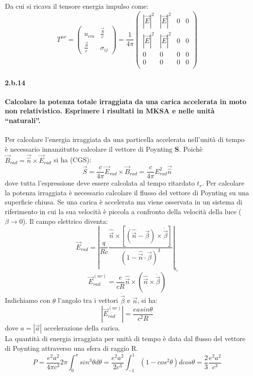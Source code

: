 \documentclass[twoside]{article}
\begin{document}
Da cui si ricava il tensore energia impulso come:
\begin{equation}
    T^{\mu\nu}=\begin{pmatrix} u_{em} & \frac{\vec{S}}{c}\\\frac{\vec{S}}{c}& \sigma_{ij}\end{pmatrix}=\frac{1}{4\pi}\begin{pmatrix} |\vec{E}|^2 & |\vec{E}|^2 & 0 & 0 \\
    |\vec{E}|^2 & |\vec{E}|^2 & 0 & 0 \\ 0&0&0&0\\0&0&0&0\\
    \end{pmatrix}
\end{equation}

\paragraph{2.b.14}\textbf{Calcolare la potenza totale irraggiata da una carica accelerata in moto non relativistico. Esprimere i risultati in MKSA e nelle unità “naturali”.}\\ \\
Per calcolare l'energia irraggiata da una particella accelerata nell'unità di tempo è necessario innanzitutto calcolare il vettore di Poynting \textbf{S}. Poichè $\vec{B}_{rad}=\vec{\hat{n}} \times \vec{E}_{rad}$ si ha (CGS):
\[
\vec{S}=\frac{c}{4 \pi}\vec{E}_{rad}\times \vec{B}_{rad} = \frac{c}{4 \pi} E^2_{rad}\vec{\hat{n}}
\]
dove tutta l'espressione deve essere calcolata al tempo ritardato $t_r$. Per calcolare la potenza irraggiata è necessario calcolare il flusso del vettore di Poynting su una superficie chiusa.  Se una carica è accelerata ma viene osservata in un sistema di riferimento in cui la sua velocità è piccola a confronto della velocità della
luce ($\beta \rightarrow 0$). Il campo elettrico diventa:
\[
\vec{E}_{rad}=\left| \frac{q}{R c}\frac{\hat{\vec{n}}\times[(\hat{\vec{n}}-\vec{\beta})\times \dot{\vec{\beta}}]}{(1-\hat{\vec{n}}\cdot \vec{\beta})^3}\right|_{t_r}
\]
\[
\vec{E}_{rad}^{(nr)}=\frac{e}{cR}\hat{\vec{n}} \times (\hat{\vec{n}}\times \dot{\vec{\beta}})
\]
Indichiamo con $\theta$ l'angolo tra i vettori $\dot{\vec{\beta}}$ e $\vec{n}$, si ha:
\[
|\vec{E}_{rad}^{(nr)}|=\frac{ea sin\theta}{c^2 R}
\]
dove $a=|\vec{a}|$ accelerazione della carica.\\
La quantità di energia irraggiata per unità di tempo è data dal flusso del vettore di Poynting attraverso una sfera di raggio R.
\begin{equation}\label{2b.14 Larmor}
    P=\frac{e^2a^2}{4\pi c^3}2\pi\int_0^{\pi}sin^3\theta d\theta=\frac{e^2a^2}{2c^3}\int_{-1}^{1}(1-cos^2\theta) dcos\theta=\frac{2}{3}\frac{e^2a^2}{c^3}
\end{equation}
\end{document}
